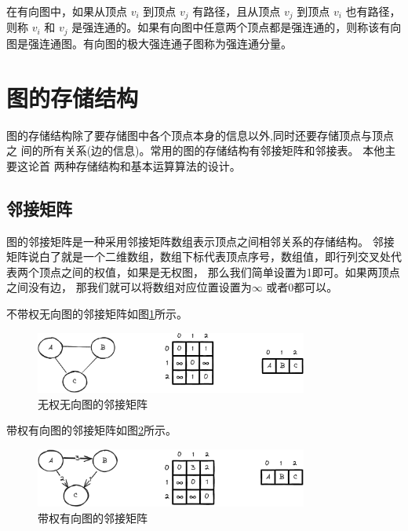 \documentclass[lang=cn,newtx,10pt,scheme=chinese]{../elegantbook}
\begin{document}
在有向图中，如果从顶点 $v_i$ 到顶点 $v_j$ 有路径，且从顶点 $v_j$ 到顶点 $v_i$ 也有路径，则称 $v_i$ 和 $v_j$ 是强连通的。如果有向图中任意两个顶点都是强连通的，则称该有向图是强连通图。有向图的极大强连通子图称为强连通分量。




\section{图的存储结构}
图的存储结构除了要存储图中各个顶点本身的信息以外,同时还要存储顶点与顶点之
间的所有关系(边的信息)。常用的图的存储结构有邻接矩阵和邻接表。 本他主要这论首
两种存储结构和基本运算算法的设计。

\subsection{邻接矩阵}
图的邻接矩阵是一种采用邻接矩阵数组表示顶点之间相邻关系的存储结构。
邻接矩阵说白了就是一个二维数组，数组下标代表顶点序号，数组值，即行列交叉处代表两个顶点之间的权值，如果是无权图，
那么我们简单设置为1即可。如果两顶点之间没有边，
那我们就可以将数组对应位置设置为$\infty$ 或者0都可以。

不带权无向图的邻接矩阵如图\ref{fig:adjacencyMatrix_UnWeightUndirected}所示。

\begin{figure}[h!]
  \centering
  \includegraphics[width=0.8\textwidth]{./figure/pdf/cropped/adjacencyMatrix_UnWeightUndirected.pdf}
  \caption{无权无向图的邻接矩阵}
  \label{fig:adjacencyMatrix_UnWeightUndirected}
\end{figure}

带权有向图的邻接矩阵如图\ref{fig:adjacencyMatrix_WeightedDirected}所示。

\begin{figure}[h!]
  \centering
  \includegraphics[width=0.8\textwidth]{./figure/pdf/cropped/adjacencyMatrix_weightDirected.pdf}
  \caption{带权有向图的邻接矩阵}
  \label{fig:adjacencyMatrix_WeightedDirected}
\end{figure}
\end{document}
